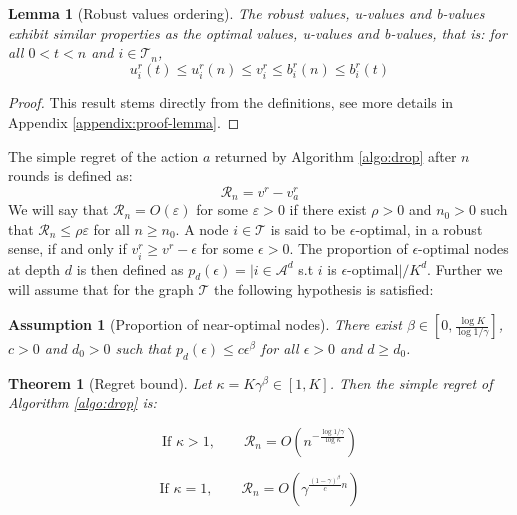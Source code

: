\documentclass{article}
\newtheorem{assumption}{Assumption}
\newtheorem{lemma}{Lemma}
\newtheorem{theorem}{Theorem}
\begin{document}
\begin{lemma}[Robust values ordering]
The robust values, u-values and b-values exhibit similar properties as the optimal values, u-values and b-values, that is: for all $0 < t < n$ and $i\in\mathcal{T}_n$,
\begin{equation}
u^r_i(t) \leq u^r_i(n) \leq v^r_i \leq b^r_i(n) \leq b^r_i(t)
\end{equation}
\label{lemma:uvb}
\end{lemma}

\vspace{-5mm}
\begin{proof}
This result stems directly from the definitions, see more details in Appendix \ref{appendix:proof-lemma}.
\end{proof}

\vspace{-1mm}
The simple regret of the action $a$ returned by Algorithm \ref{algo:drop} after $n$ rounds is defined as:
\begin{equation}
\mathcal{R}_n = v^r - v_a^r
\end{equation}
We will say that $\mathcal{R}_n=O(\varepsilon)$ for some $\varepsilon>0$ if there exist $\rho>0$ and $n_0>0$ such that $\mathcal{R}_n\leq\rho\varepsilon$ for all $n\geq n_0$.
A node $i\in\mathcal{T}$ is said to be $\epsilon$-optimal, in a robust sense, if and only if $v_i^r \geq v^r - \epsilon$ for some $\epsilon > 0$. The proportion of $\epsilon$-optimal nodes at depth $d$ is then defined as $p_d(\epsilon) = |i \in \mathcal{A}^d$ s.t $i$ is $\epsilon$-optimal$|/K^d$. Further we will assume that for the graph $\mathcal{T}$ the following hypothesis is satisfied:
\begin{assumption}[Proportion of near-optimal nodes]
\label{assumpt:beta}
There exist $\beta\in[0, \frac{\log K}{\log 1/\gamma}]$, $c > 0$ and $d_0 > 0$ such that $p_d(\epsilon)\leq c\epsilon^\beta$ for all $\epsilon > 0$ and $d\geq d_0$.
\end{assumption}

\begin{theorem}[Regret bound]
\label{theorem:drop-regret}
Let $\kappa = K\gamma^\beta \in [1, K]$. Then the simple regret of Algorithm \ref{algo:drop} is:


\vspace{-5mm}
\begin{equation}
\text{If } \kappa>1,\qquad 
\mathcal{R}_n = O\left(n^{-\frac{\log 1/\gamma}{\log \kappa}}\right)
\end{equation}

\vspace{-4mm}
\begin{equation}
\text{If }\kappa=1,\qquad
\mathcal{R}_n = O\left(\gamma^{\frac{(1-\gamma)^\beta}{c}n}\right)
\end{equation}
\end{theorem}
\end{document}
